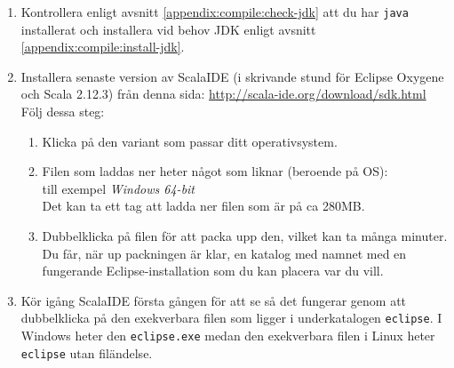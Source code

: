 \begin{enumerate}
\item Kontrollera enligt avsnitt \ref{appendix:compile:check-jdk} att du har \texttt{java} installerat och installera vid behov JDK enligt avsnitt \ref{appendix:compile:install-jdk}.

\item Installera senaste version av ScalaIDE (i skrivande stund \ScalaVersion för Eclipse Oxygene och Scala 2.12.3) från denna sida:  \url{http://scala-ide.org/download/sdk.html} \\
Följ dessa steg:
\begin{enumerate}
\item Klicka på den variant som passar ditt operativsystem.
\item Filen som laddas ner heter något som liknar (beroende på OS): \\ till exempel  \emph{Windows 64-bit}
\\ Det kan ta ett tag att ladda ner filen som är på ca 280MB.

\item Dubbelklicka på filen för att packa upp den, vilket kan ta många minuter. Du får, när up	packningen är klar, en katalog med namnet  med en fungerande Eclipse-installation som du kan placera var du vill.
\end{enumerate}

\item Kör igång ScalaIDE första gången för att se så det fungerar genom att dubbelklicka på den exekverbara filen som ligger i underkatalogen \texttt{eclipse}. I Windows heter den \texttt{eclipse.exe} medan den exekverbara filen i Linux heter \texttt{eclipse} utan filändelse.


\end{enumerate}
